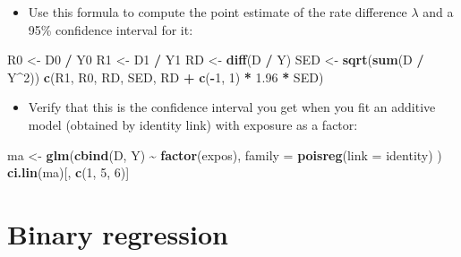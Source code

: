 \documentclass[
]{book}
\newenvironment{Shaded}{\begin{snugshade}}{\end{snugshade}}
\newcommand{\AttributeTok}[1]{\textcolor[rgb]{0.13,0.29,0.53}{#1}}
\newcommand{\DecValTok}[1]{\textcolor[rgb]{0.00,0.00,0.81}{#1}}
\newcommand{\FloatTok}[1]{\textcolor[rgb]{0.00,0.00,0.81}{#1}}
\newcommand{\FunctionTok}[1]{\textcolor[rgb]{0.13,0.29,0.53}{\textbf{#1}}}
\newcommand{\NormalTok}[1]{#1}
\newcommand{\OtherTok}[1]{\textcolor[rgb]{0.56,0.35,0.01}{#1}}
\newcommand{\SpecialCharTok}[1]{\textcolor[rgb]{0.81,0.36,0.00}{\textbf{#1}}}
\providecommand{\tightlist}{%
  \setlength{\itemsep}{0pt}\setlength{\parskip}{0pt}}
\begin{document}
\begin{itemize}
\tightlist
\item
  Use this formula to compute the point estimate of the rate difference \(\lambda\) and a 95\% confidence interval for it:
\end{itemize}

\begin{Shaded}
\begin{Highlighting}[]
\NormalTok{R0 }\OtherTok{\textless{}{-}}\NormalTok{ D0 }\SpecialCharTok{/}\NormalTok{ Y0}
\NormalTok{R1 }\OtherTok{\textless{}{-}}\NormalTok{ D1 }\SpecialCharTok{/}\NormalTok{ Y1}
\NormalTok{RD }\OtherTok{\textless{}{-}} \FunctionTok{diff}\NormalTok{(D }\SpecialCharTok{/}\NormalTok{ Y)}
\NormalTok{SED }\OtherTok{\textless{}{-}} \FunctionTok{sqrt}\NormalTok{(}\FunctionTok{sum}\NormalTok{(D }\SpecialCharTok{/}\NormalTok{ Y}\SpecialCharTok{\^{}}\DecValTok{2}\NormalTok{))}
\FunctionTok{c}\NormalTok{(R1, R0, RD, SED, RD }\SpecialCharTok{+} \FunctionTok{c}\NormalTok{(}\SpecialCharTok{{-}}\DecValTok{1}\NormalTok{, }\DecValTok{1}\NormalTok{) }\SpecialCharTok{*} \FloatTok{1.96} \SpecialCharTok{*}\NormalTok{ SED)}
\end{Highlighting}
\end{Shaded}

\begin{itemize}
\tightlist
\item
  Verify that this is the confidence interval you get when you fit
  an additive model (obtained by identity link) with exposure as a factor:
\end{itemize}

\begin{Shaded}
\begin{Highlighting}[]
\NormalTok{ma }\OtherTok{\textless{}{-}} \FunctionTok{glm}\NormalTok{(}\FunctionTok{cbind}\NormalTok{(D, Y) }\SpecialCharTok{\textasciitilde{}} \FunctionTok{factor}\NormalTok{(expos),}
  \AttributeTok{family =} \FunctionTok{poisreg}\NormalTok{(}\AttributeTok{link =}\NormalTok{ identity)}
\NormalTok{)}
\FunctionTok{ci.lin}\NormalTok{(ma)[, }\FunctionTok{c}\NormalTok{(}\DecValTok{1}\NormalTok{, }\DecValTok{5}\NormalTok{, }\DecValTok{6}\NormalTok{)]}
\end{Highlighting}
\end{Shaded}

\section{Binary regression}\label{binary-regression}
\end{document}
